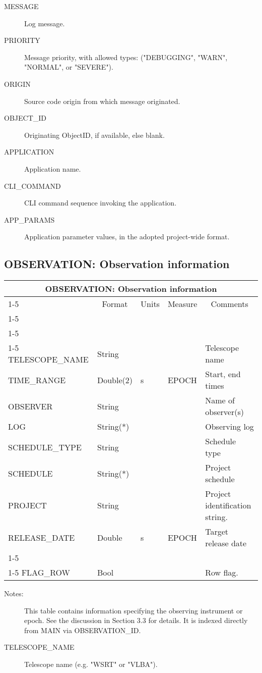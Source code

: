 \documentclass{article}
\newcommand{\defline}[1]{\cline{1-5}
\multicolumn{5}{|l|}{#1} \\
\cline{1-5}}
\newcommand{\definetable}[2]
{
	\vfill\newpage
	\subsection{#1}
        \vspace{0.15in}
        \small
	\begin{tabular}{|l|p{1.25in}|l|p{.9in}|p{1.4in}|}
	\hline
	\multicolumn{5}{|c|}{\bf #1}\\ 
	\cline{1-5}
        \multicolumn{1}{|c|}{Name}&\multicolumn{1}{|c|}{Format}&
        \multicolumn{1}{|c|}{Units}&\multicolumn{1}{|c|}{Measure}&
        \multicolumn{1}{|c|}{Comments}\\
        \cline{1-5}
        #2
        \hline
	\end{tabular}
}
\begin{document}
\begin{itemize}
\begin{description}
\item[MESSAGE] Log message.

\item[PRIORITY] Message priority, with allowed types: ("DEBUGGING",
"WARN", "NORMAL", or "SEVERE").

\item[ORIGIN] Source code origin from which message originated.

\item[OBJECT\_ID] Originating ObjectID, if available, else blank.

\item[APPLICATION] Application name.

\item[CLI\_COMMAND] CLI command sequence invoking the application.

\item[APP\_PARAMS] Application parameter values, in the adopted
project-wide format.
\end{description}

\definetable{OBSERVATION: Observation information}{
\defline{\bf Columns}
\defline{\em Data}  
TELESCOPE\_NAME &      String &    &      & Telescope name\\
TIME\_RANGE       &     Double(2) & s & EPOCH & Start, end times\\
OBSERVER &       String &    &      & Name of observer(s)\\
LOG &   String(*) & & & Observing log \\
SCHEDULE\_TYPE &  String & & & Schedule type\\
SCHEDULE &       String(*) &    &      & Project schedule\\
PROJECT &               String &    &      & Project identification string.\\
RELEASE\_DATE &         Double &  s  & EPOCH & Target release date\\
\defline{\em Flags}
FLAG\_ROW  & Bool & & & Row flag.\\
}

\begin{description}

\item[Notes:] This table contains information specifying the observing
instrument or epoch. See the discussion in Section 3.3 for details. It
is indexed directly from MAIN via OBSERVATION\_ID.

\item[TELESCOPE\_NAME] Telescope name (e.g. "WSRT" or "VLBA").


\end{description}
\end{itemize}
\end{document}
